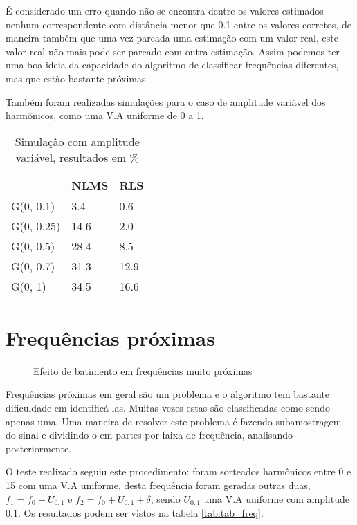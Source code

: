 \indent É considerado um erro quando não se encontra dentre os valores estimados nenhum correspondente com distância menor que 0.1 entre os valores corretos, de maneira também que uma vez pareada uma estimação com um valor real, este valor real não mais pode ser pareado com outra estimação. Assim podemos ter uma boa ideia da capacidade do algoritmo de classificar frequências diferentes, mas que estão bastante próximas.

\indent Também foram realizadas simulações para o caso de amplitude variável dos harmônicos, como uma V.A uniforme de 0 a 1.

\begin{table}[H]
	\centering
	\begin{tabular}{l|l|l}
		& NLMS & RLS \\
		\hline 
		G(0, 0.1)  & 3.4    & 0.6 \\
		G(0, 0.25) & 14.6   & 2.0  \\
		G(0, 0.5)  & 28.4  & 8.5  \\
		G(0, 0.7)  & 31.3  & 12.9  \\
		G(0, 1)    & 34.5  & 16.6 \\ 
	\end{tabular}
\caption{Simulação com amplitude variável, resultados em \%}
\end{table}

\section{Frequências próximas}

\begin{figure}[h]
	\centering    
	\def\svgwidth{\columnwidth}
	
	\caption{Efeito de batimento em frequências muito próximas}
	\label{fig:your image label}
\end{figure}

\indent Frequências próximas em geral são um problema e o algoritmo tem bastante dificuldade em identificá-las. Muitas vezes estas são classificadas como sendo apenas uma. Uma maneira de resolver este problema é fazendo subamostragem do sinal e dividindo-o em partes por faixa de frequência, analisando posteriormente.

\indent O teste realizado seguiu este procedimento: foram sorteados harmônicos entre 0 e 15 com uma V.A uniforme, desta frequência foram geradas outras duas, $f_1=f_0+U_{0,1}$ e $f_2=f_0+U_{0,1}+\delta$, sendo $U_{0,1}$ uma V.A uniforme com amplitude 0.1. Os resultados podem ser vistos na tabela \ref{tab:tab_freq}.


